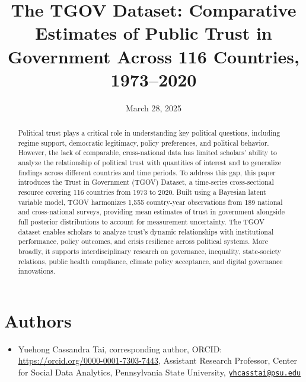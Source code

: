 \documentclass[
  12pt,
]{article}
\title{The TGOV Dataset: Comparative Estimates of Public Trust in Government Across 116 Countries, 1973--2020}
\author{}
\date{\vspace{-2.5em}March 28, 2025}
\providecommand{\tightlist}{%
  \setlength{\itemsep}{0pt}\setlength{\parskip}{0pt}}
\begin{document}
\maketitle


\section*{Authors}\label{authors}

\begin{itemize}
\tightlist
\item
  Yuehong Cassandra Tai, corresponding author, ORCID: \url{https://orcid.org/0000-0001-7303-7443}, Assistant Research Professor, Center for Social Data Analytics, Pennsylvania State University, \href{mailto:yhcasstai@psu.edu}{\nolinkurl{yhcasstai@psu.edu}}
\end{itemize}

\pagebreak

\renewcommand{\baselinestretch}{1}
\selectfont
\maketitle
\renewcommand{\baselinestretch}{1.5}
\selectfont

\begin{abstract}
Political trust plays a critical role in understanding key political questions, including regime support, democratic legitimacy, policy preferences, and political behavior. However, the lack of comparable, cross-national data has limited scholars' ability to analyze the relationship of political trust with quantities of interest and to generalize findings across different countries and time periods. To address this gap, this paper introduces the Trust in Government (TGOV) Dataset, a time-series cross-sectional resource covering 116 countries from 1973 to 2020. Built using a Bayesian latent variable model, TGOV harmonizes 1,555 country-year observations from 189 national and cross-national surveys, providing mean estimates of trust in government alongside full posterior distributions to account for measurement uncertainty. The TGOV dataset enables scholars to analyze trust’s dynamic relationships with institutional performance, policy outcomes, and crisis resilience across political systems. More broadly, it supports interdisciplinary research on governance, inequality, state-society relations, public health compliance, climate policy acceptance, and digital governance innovations.

\end{abstract}
\end{document}
